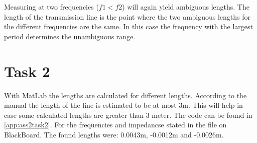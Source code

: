 \documentclass[final]{scrreprt} %
\begin{document}
Measuring at two frequencies ($f1 < f2$) will again yield ambiguous lengths. The length of the transmission line is the point where the two ambiguous lengths for the different frequencies are the same. In this case the frequency with the largest period determines the unambiguous range.


\section{Task 2}

With MatLab the lengths are calculated for different lengths. According to the manual the length of the line is estimated to be at most 3m. This will help in case some calculated lengths are greater than 3 meter. The code can be found in \ref{app:ass2task2}.
For the frequencies and impedancse stated in the file on BlackBoard. The found lengths were: 0.0043m, -0.0012m and -0.0026m.
\end{document}
